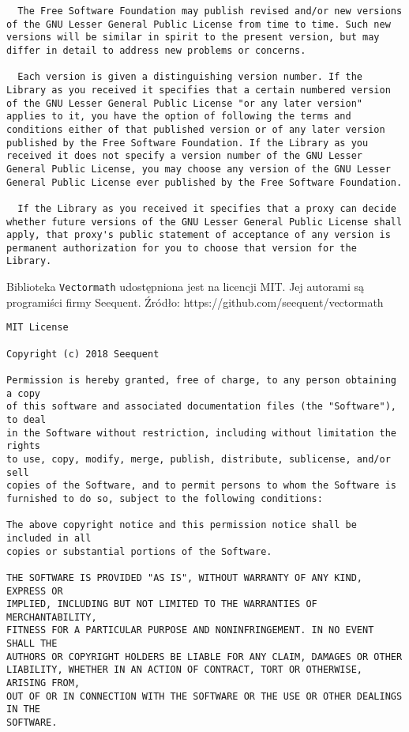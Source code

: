 \documentclass[a4paper]{article}
\begin{document}
\begin{verbatim}
  The Free Software Foundation may publish revised and/or new versions
of the GNU Lesser General Public License from time to time. Such new
versions will be similar in spirit to the present version, but may
differ in detail to address new problems or concerns.

  Each version is given a distinguishing version number. If the
Library as you received it specifies that a certain numbered version
of the GNU Lesser General Public License "or any later version"
applies to it, you have the option of following the terms and
conditions either of that published version or of any later version
published by the Free Software Foundation. If the Library as you
received it does not specify a version number of the GNU Lesser
General Public License, you may choose any version of the GNU Lesser
General Public License ever published by the Free Software Foundation.

  If the Library as you received it specifies that a proxy can decide
whether future versions of the GNU Lesser General Public License shall
apply, that proxy's public statement of acceptance of any version is
permanent authorization for you to choose that version for the
Library.
\end{verbatim}

Biblioteka \texttt{Vectormath} udostępniona jest na licencji MIT. Jej
autorami są programiści firmy Seequent. Źródło:
https://github.com/seequent/vectormath

\begin{verbatim}
MIT License

Copyright (c) 2018 Seequent

Permission is hereby granted, free of charge, to any person obtaining a copy
of this software and associated documentation files (the "Software"), to deal
in the Software without restriction, including without limitation the rights
to use, copy, modify, merge, publish, distribute, sublicense, and/or sell
copies of the Software, and to permit persons to whom the Software is
furnished to do so, subject to the following conditions:

The above copyright notice and this permission notice shall be included in all
copies or substantial portions of the Software.

THE SOFTWARE IS PROVIDED "AS IS", WITHOUT WARRANTY OF ANY KIND, EXPRESS OR
IMPLIED, INCLUDING BUT NOT LIMITED TO THE WARRANTIES OF MERCHANTABILITY,
FITNESS FOR A PARTICULAR PURPOSE AND NONINFRINGEMENT. IN NO EVENT SHALL THE
AUTHORS OR COPYRIGHT HOLDERS BE LIABLE FOR ANY CLAIM, DAMAGES OR OTHER
LIABILITY, WHETHER IN AN ACTION OF CONTRACT, TORT OR OTHERWISE, ARISING FROM,
OUT OF OR IN CONNECTION WITH THE SOFTWARE OR THE USE OR OTHER DEALINGS IN THE
SOFTWARE.
\end{verbatim}
\end{document}

